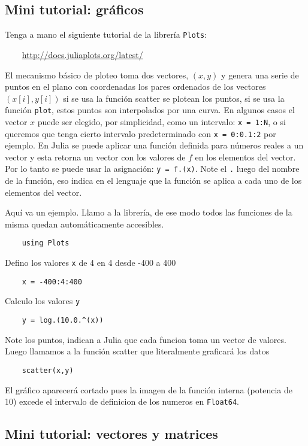 \documentclass[a4paper]{article}
\begin{document}
\subsection*{Mini tutorial: gr\'aficos}


Tenga a mano el siguiente tutorial de la librer\'ia \verb+Plots+: 

\verb+    +\href{http://docs.juliaplots.org/latest/}
{http://docs.juliaplots.org/latest/}

El mecanismo b\'asico de ploteo toma dos vectores, $(x, y)$ y genera una serie de puntos en el plano con coordenadas los pares ordenados de los vectores 
$(x[i],y[i])$ si se usa la funci\'on scatter se plotean los puntos, si se usa la funci\'on \verb+plot+, 
estos puntos son interpolados por una curva. En algunos casos el vector $x$ puede ser elegido, por simplicidad, como un intervalo: \verb+x = 1:N+, o si queremos que tenga cierto intervalo predeterminado con \verb+x = 0:0.1:2+ por ejemplo. 
En Julia se puede 
aplicar una funci\'on definida para n\'umeros reales a un vector y esta retorna un vector con los valores de $f$ en los elementos del vector. 
Por lo tanto se puede usar la asignaci\'on: \verb+y = f.(x)+.
Note el \verb+.+ luego del nombre de la funci\'on, eso indica en el lenguaje que la funci\'on se aplica a cada uno de los elementos del vector.

Aqu\'i va un ejemplo. 
Llamo a la librer\'ia, de ese modo todos las funciones de la misma quedan autom\'aticamente accesibles.

\verb+    using Plots+

Defino los valores \verb+x+ de 4 en 4 desde -400 a 400

\verb+    x = -400:4:400+

Calculo los valores \verb+y+

\verb+    y = log.(10.0.^(x))+

Note los puntos, indican a Julia que cada funcion toma un vector de valores. 
Luego llamamos a la funci\'on scatter que literalmente graficar\'a los datos

\verb+    scatter(x,y)+

El gr\'afico aparecer\'a cortado pues la imagen de la funci\'on interna (potencia de 10) excede el intervalo de definicion de los numeros en \verb+Float64+.


\subsection*{Mini tutorial: vectores y matrices}
\end{document}

